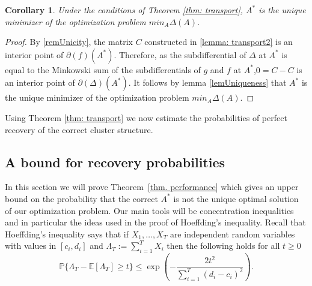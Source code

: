 \documentclass[12pt]{amsart}
\newtheorem{cor}[lemma]{Corollary}
\theoremstyle{remark}
\newcommand{\PP}{\mathbb{P}}
\newcommand{\EE}{\mathbb{E}}
\begin{document}
\begin{cor}
Under the conditions of Theorem \ref{thm: transport}, $A^*$ is the unique minimizer of the optimization problem $min_A\Delta (A)$.
\end{cor}
\begin{proof}
By \ref{remUnicity}, the matrix $C$ constructed in \ref{lemma: transport2} is an interior point of  $\partial(f)(A^*)$. Therefore, as the subdifferential of $\Delta$ at $A^*$ is equal to the Minkowski sum of the subdifferentials of $g$ and $f$ at $A^*$,$0=C-C$ is an interior point of $\partial(\Delta)(A^*)$. It follows by lemma \ref{lemUniqueness} that $A^*$ is the unique minimizer of the optimization problem  $min_A\Delta (A)$.


\end{proof}



Using  Theorem \ref{thm: transport} we now estimate the probabilities of perfect recovery of the correct cluster structure. 



\subsection{A bound for recovery probabilities}

In this section we will prove Theorem~\ref{thm. performance} which gives an upper bound on the probability that the correct $A^*$ is not the unique optimal solution of our optimization problem. Our main tools will be concentration inequalities and in particular the ideas used in the proof of Hoeffding's inequality. Recall that Hoeffding's inequality says that if $X_1,\dots, X_T$ are independent random variables with values in $[c_i,d_i]$ and $\Lambda_T:=\sum_{i=1}^T X_i$ then the following holds for all $t\geq 0$ 
\[\PP\{\Lambda_T-\EE[\Lambda_T]\geq t\}\leq \exp\left(-\frac{2t^2}{\sum_{i=1}^T (d_i-c_i)^2}\right).\]
\end{document}
